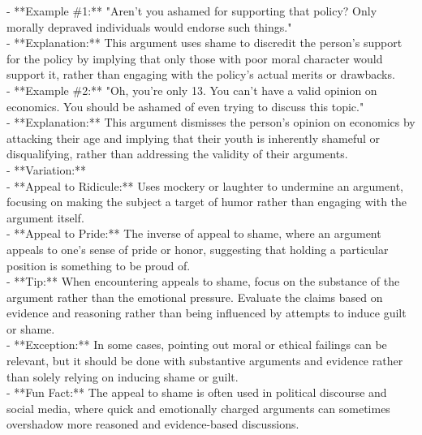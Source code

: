 \documentclass[a4paper,12pt,single,pdftex]{scrartcl}
\begin{document}
{    
      - **Example \#1:** "Aren't you ashamed for supporting that policy? Only morally depraved individuals would endorse such things."
    \\

    
      - **Explanation:** This argument uses shame to discredit the person's support for the policy by implying that only those with poor moral character would support it, rather than engaging with the policy’s actual merits or drawbacks.
    \\

    
      - **Example \#2:** "Oh, you're only 13. You can't have a valid opinion on economics. You should be ashamed of even trying to discuss this topic."
    \\

    
      - **Explanation:** This argument dismisses the person's opinion on economics by attacking their age and implying that their youth is inherently shameful or disqualifying, rather than addressing the validity of their arguments.
    \\

    
      - **Variation:**
    \\

    
        - **Appeal to Ridicule:** Uses mockery or laughter to undermine an argument, focusing on making the subject a target of humor rather than engaging with the argument itself.
    \\

    
        - **Appeal to Pride:** The inverse of appeal to shame, where an argument appeals to one's sense of pride or honor, suggesting that holding a particular position is something to be proud of.
    \\

    
      - **Tip:** When encountering appeals to shame, focus on the substance of the argument rather than the emotional pressure. Evaluate the claims based on evidence and reasoning rather than being influenced by attempts to induce guilt or shame.
    \\

    
      - **Exception:** In some cases, pointing out moral or ethical failings can be relevant, but it should be done with substantive arguments and evidence rather than solely relying on inducing shame or guilt.
    \\

    
      - **Fun Fact:** The appeal to shame is often used in political discourse and social media, where quick and emotionally charged arguments can sometimes overshadow more reasoned and evidence-based discussions.
    \\

  }
\end{document}
